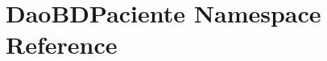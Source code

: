 \hypertarget{namespace_dao_b_d_paciente}{}\section{Dao\+B\+D\+Paciente Namespace Reference}
\label{namespace_dao_b_d_paciente}
